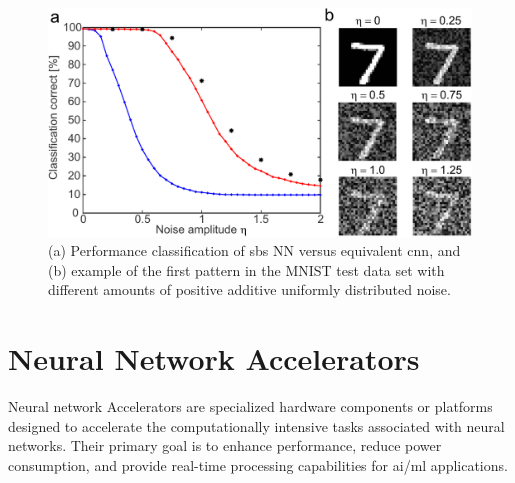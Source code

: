 \begin{figure}[b!]
	\centering
	\includegraphics[width=0.5\columnwidth]{./chapters/sbs_accelerator/figures/sbs_robustnes.pdf}
	\caption{(a) Performance classification of \gls{sbs} NN versus equivalent \gls{cnn}, and (b) example of the first pattern in the MNIST test data set with different amounts of positive additive uniformly distributed noise.}
	\label{fig:robustnes_sbs}
\end{figure}


\section{Neural Network Accelerators}
Neural network Accelerators are specialized hardware components or platforms designed to accelerate the computationally intensive tasks associated with neural networks. Their primary goal is to enhance performance, reduce power consumption, and provide real-time processing capabilities for \gls{ai}/\gls{ml} applications.

